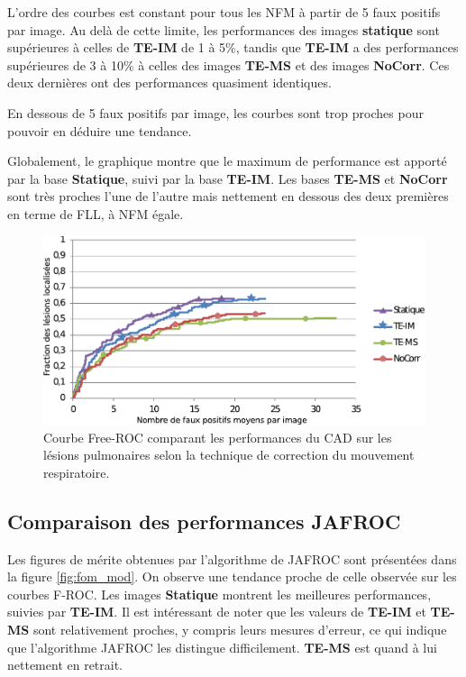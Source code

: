 L'ordre des courbes est constant pour tous les NFM à partir de 5 faux positifs par image. Au delà de cette limite, les performances des images \textbf{statique} sont supérieures à celles de \textbf{TE-IM} de 1 à 5\%, tandis que \textbf{TE-IM} a des performances supérieures de 3 à 10\% à celles des images \textbf{TE-MS} et des images \textbf{NoCorr}. Ces deux dernières ont des performances quasiment identiques.

En dessous de 5 faux positifs par image, les courbes sont trop proches pour pouvoir en déduire une tendance.


Globalement, le graphique montre que le maximum de performance est apporté par la base \textbf{Statique}, suivi par la base \textbf{TE-IM}. Les bases \textbf{TE-MS} et \textbf{NoCorr} sont très proches l'une de l'autre mais nettement en dessous des deux premières en terme de FLL, à NFM égale.

\begin{figure}[h!]
 \begin{center}
   \includegraphics[width=13cm]{images/FROC_mod_corrige}
 \end{center}
 \caption{Courbe Free-ROC comparant les performances du CAD sur les lésions pulmonaires selon la technique de correction du mouvement respiratoire.}
 \label{fig:froc_mod}
\end{figure}


\subsection{Comparaison des performances JAFROC}

Les figures de mérite obtenues par l'algorithme de JAFROC sont présentées dans la figure \ref{fig:fom_mod}. On observe une tendance proche de celle observée sur les courbes F-ROC. Les images \textbf{Statique} montrent les meilleures performances, suivies par \textbf{TE-IM}. Il est intéressant de noter que les valeurs de \textbf{TE-IM} et \textbf{TE-MS} sont relativement proches, y compris leurs mesures d'erreur, ce qui indique que l'algorithme JAFROC les distingue difficilement. \textbf{TE-MS} est quand à lui nettement en retrait. 


